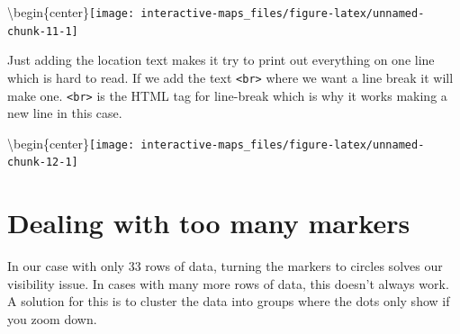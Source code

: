 \documentclass[
  12pt,
]{book}
\newenvironment{Shaded}{\begin{snugshade}}{\end{snugshade}}
\newcommand{\DataTypeTok}[1]{\textcolor[rgb]{0.13,0.29,0.53}{#1}}
\newcommand{\DecValTok}[1]{\textcolor[rgb]{0.00,0.00,0.81}{#1}}
\newcommand{\KeywordTok}[1]{\textcolor[rgb]{0.13,0.29,0.53}{\textbf{#1}}}
\newcommand{\NormalTok}[1]{#1}
\newcommand{\OperatorTok}[1]{\textcolor[rgb]{0.81,0.36,0.00}{\textbf{#1}}}
\newcommand{\StringTok}[1]{\textcolor[rgb]{0.31,0.60,0.02}{#1}}
\begin{document}
\textbackslash begin\{center\}\texttt{[image: interactive-maps\_files/figure-latex/unnamed-chunk-11-1]}

Just adding the location text makes it try to print out everything on one line which is hard to read. If we add the text \texttt{\textless{}br\textgreater{}} where we want a line break it will make one. \texttt{\textless{}br\textgreater{}} is the HTML tag for line-break which is why it works making a new line in this case.

\begin{Shaded}
\end{Shaded}

\textbackslash begin\{center\}\texttt{[image: interactive-maps\_files/figure-latex/unnamed-chunk-12-1]}

\hypertarget{dealing-with-too-many-markers}{%
\section{Dealing with too many markers}\label{dealing-with-too-many-markers}}

In our case with only 33 rows of data, turning the markers to circles solves our visibility issue. In cases with many more rows of data, this doesn't always work. A solution for this is to cluster the data into groups where the dots only show if you zoom down.
\end{document}
